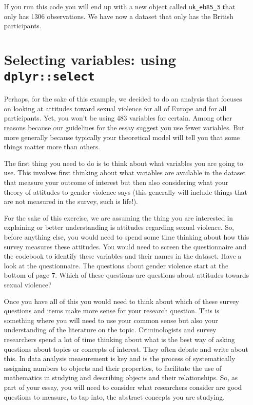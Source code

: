 \documentclass[
]{book}
\begin{document}
If you run this code you will end up with a new object called \texttt{uk\_eb85\_3} that only has 1306 observations. We have now a dataset that only has the British participants.

\section{\texorpdfstring{Selecting variables: using \texttt{dplyr::select}}{Selecting variables: using dplyr::select}}\label{selecting-variables-using-dplyrselect}

Perhaps, for the sake of this example, we decided to do an analysis that focuses on looking at attitudes toward sexual violence for all of Europe and for all participants. Yet, you won't be using 483 variables for certain. Among other reasons because our guidelines for the essay suggest you use fewer variables. But more generally because typically your theoretical model will tell you that some things matter more than others.

The first thing you need to do is to think about what variables you are going to use. This involves first thinking about what variables are available in the dataset that measure your outcome of interest but then also considering what your theory of attitudes to gender violence says (this generally will include things that are not measured in the survey, such is life!).

For the sake of this exercise, we are assuming the thing you are interested in explaining or better understanding is attitudes regarding sexual violence. So, before anything else, you would need to spend some time thinking about how this survey measures these attitudes. You would need to screen the questionnaire and the codebook to identify these variables and their names in the dataset. Have a look at the questionnaire. The questions about gender violence start at the bottom of page 7. Which of these questions are questions about attitudes towards sexual violence?

Once you have all of this you would need to think about which of these survey questions and items make more sense for your research question. This is something where you will need to use your common sense but also your understanding of the literature on the topic. Criminologists and survey researchers spend a lot of time thinking about what is the best way of asking questions about topics or concepts of interest. They often debate and write about this. In data analysis measurement is key and is the process of systematically assigning numbers to objects and their properties, to facilitate the use of mathematics in studying and describing objects and their relationships. So, as part of your essay, you will need to consider what researchers consider are good questions to measure, to tap into, the abstract concepts you are studying.
\end{document}
